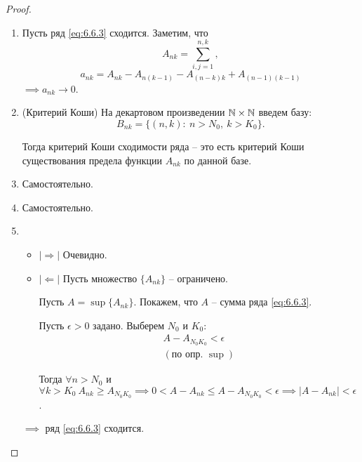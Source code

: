 \begin{proof}\leavevmode
    \begin{enumerate}
        \item Пусть ряд \ref{eq:6.6.3} сходится. Заметим, что
              \[
                  A_{nk} = \sum_{i,j=1}^{n,k},
              \]
              \[
                  a_{nk} = A_{nk} - A_{n(k-1)} - A_{(n-k)k} + A_{(n-1)(k-1)}
              \]
              $\implies a_{nk} \rightarrow 0 $.

        \item (Критерий Коши)
              На декартовом произведении $\mathbb{N}\times\mathbb{N}$ введем базу:
              \[
                  B_{nk} = \big\{(n,k): \ n > N_0, \ k > K_0\big\}.
              \]

              Тогда критерий Коши сходимости ряда -- это есть критерий Коши существования предела функции $A_{nk}$ по данной базе.

        \item Самостоятельно.

        \item Самостоятельно.

        \item \begin{itemize}
                  \item $ |\Rightarrow| $ Очевидно.

                  \item $ |\Leftarrow| $ Пусть множество $\{A_{nk}\}$ -- ограничено.

                        Пусть $A = \sup\{A_{nk}\}$. Покажем, что $A$ -- сумма ряда \ref{eq:6.6.3}.

                        Пусть $\epsilon > 0$ задано. Выберем $N_0$ и $K_0$:
                        \[
                            \begin{array}{c}
                                A - A_{N_0 K_0} < \epsilon \\
                                (\text{по опр. }\sup)
                            \end{array}
                        \]

                        Тогда $ \forall n > N_0$ и $ \forall k > K_0 \ A_{nk} \geqslant A_{N_0K_0} \implies 0 < A - A_{nk} \leqslant A - A_{N_0K_0} < \epsilon \implies |A - A_{nk}| < \epsilon $.
              \end{itemize}

              $ \implies  $ ряд \ref{eq:6.6.3} сходится.
    \end{enumerate}
\end{proof}

